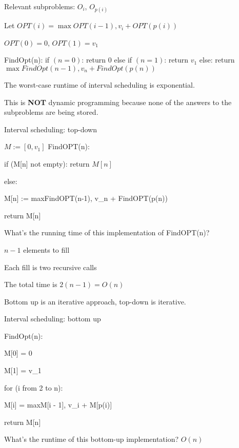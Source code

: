 \documentclass[12pt]{article}
\begin{document}
Relevant subproblems: $O_i$, $O_{p(i)}$

Let $OPT(i) = \max{OPT(i - 1), v_i + OPT\left(p(i)\right)}$

$OPT(0) = 0$, $OPT(1) = v_1$

FindOpt(n):
\quad if $(n = 0)$: return 0
\quad else if $(n = 1)$: return $v_1$
\quad else: return $\max{FindOpt(n-1), v_n + FindOpt(p(n))}$

The worst-case runtime of interval scheduling is exponential.

This is \textbf{NOT} dynamic programming because none of the answers to the subproblems are being stored.

Interval scheduling: top-down

$M := [ 0, v_1 ]$
FindOPT(n):

\quad if (M[n] not empty): return $M[n]$

\quad else:

\quad \quad M[n] := max{FindOPT(n-1), v_n + FindOPT(p(n))}

\quad \quad return M[n]

What's the running time of this implementation of FindOPT(n)?

$n - 1$ elements to fill

Each fill is two recursive calls

The total time is $2(n - 1) = O(n)$

Bottom up is an iterative approach, top-down is iterative.

Interval scheduling: bottom up

FindOpt(n):

\quad M[0] = 0

\quad M[1] = v_1

\quad for (i from 2 to n):

\quad \quad M[i] = max{M[i - 1], v_i + M[p(i)]}

\quad return M[n]

What's the runtime of this bottom-up implementation? $O(n)$
\end{document}
